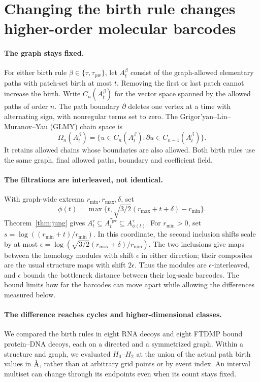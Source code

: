 \documentclass[11pt]{article}
\newcommand{\angstrom}{\ensuremath{\text{\normalfont\AA}}}
\newcommand{\pw}{\tau_{\mathrm{pw}}}
\newcommand{\Jung}{\sqrt{3/2}}
\begin{document}
\section{Changing the birth rule changes higher-order molecular barcodes}
\label{sec:barcodes}

\paragraph{The graph stays fixed.}
For either birth rule $\beta\in\{\tau,\pw\}$, let $A_t^\beta$ consist of the graph-allowed elementary paths with patch-set birth at most $t$. Removing the first or last patch cannot increase the birth. Write $C_n(A_t^\beta)$ for the vector space spanned by the allowed paths of order $n$. The path boundary $\partial$ deletes one vertex at a time with alternating sign, with nonregular terms set to zero. The Grigor'yan--Lin--Muranov--Yau (GLMY) chain space is
\[
 \Omega_n(A_t^\beta)
 =\{u\in C_n(A_t^\beta):\partial u\in C_{n-1}(A_t^\beta)\}.
\]
It retains allowed chains whose boundaries are also allowed\citep{grigoryan2012,chowdhury2018}. Both birth rules use the same graph, final allowed paths, boundary and coefficient field.

\paragraph{The filtrations are interleaved, not identical.}
With graph-wide extrema $r_{\min},r_{\max},\delta$, set
\[
 \phi(t)=\max\{t,\Jung(r_{\max}+t+\delta)-r_{\min}\}.
\]
Theorem~\ref{thm:jung} gives $A_t^\tau\subseteq A_t^{\pw}\subseteq A_{\phi(t)}^\tau$. For $r_{\min}>0$, set $s=\log((r_{\min}+t)/r_{\min})$. In this coordinate, the second inclusion shifts scale by at most $\epsilon=\log(\Jung(r_{\max}+\delta)/r_{\min})$. The two inclusions give maps between the homology modules with shift $\epsilon$ in either direction; their composites are the usual structure maps with shift $2\epsilon$. Thus the modules are $\epsilon$-interleaved, and $\epsilon$ bounds the bottleneck distance between their log-scale barcodes\citep{chazal2014,bauer2015}. The bound limits how far the barcodes can move apart while allowing the differences measured below.

\paragraph{The difference reaches cycles and higher-dimensional classes.}
We compared the birth rules in eight RNA decoys and eight FTDMP bound protein--DNA decoys\citep{ftdmpdata}, each on a directed and a symmetrized graph. Within a structure and graph, we evaluated $H_0$--$H_2$ at the union of the actual path birth values in \angstrom, rather than at arbitrary grid points or by event index. An interval multiset can change through its endpoints even when its count stays fixed.
\end{document}
